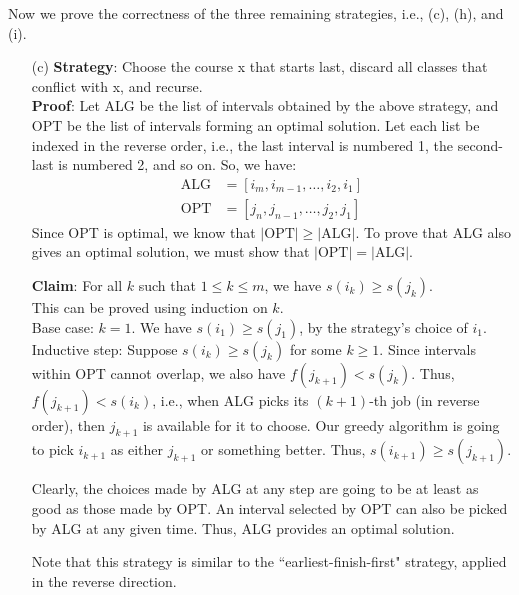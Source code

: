 \documentclass[11pt, fleqn]{article}
\begin{document}
\bigskip

Now we prove the correctness of the three remaining strategies, i.e., (c), (h), and (i).

\begin{itemize}
    \item[(c)]
    \textbf{Strategy}: Choose the course x that starts last, discard all classes that conflict with x, and recurse.\\
    \textbf{Proof}: Let ALG be the list of intervals obtained by the above strategy, and OPT be the list of intervals forming an optimal solution. Let each list be indexed in the reverse order, i.e., the last interval is numbered 1, the second-last is numbered 2, and so on. So, we have:
    \begin{align}
        \text{ALG} &= [i_m, i_{m-1}, \dots, i_2, i_1]\\
        \text{OPT} &= [j_n, j_{n-1}, \dots, j_2, j_1]
    \end{align}
    Since OPT is optimal, we know that $\lvert \text{OPT}\rvert \geq \lvert \text{ALG}\rvert$. To prove that ALG also gives an optimal solution, we must show that $\lvert \text{OPT}\rvert = \lvert \text{ALG}\rvert$.
    
    \medskip
    
    \textbf{Claim}: For all $k$ such that $1\leq k\leq m$, we have $s(i_k) \geq s(j_k)$.\\
    This can be proved using induction on $k$.\\
    Base case: $k=1$. We have $s(i_1)\geq s(j_1)$, by the strategy's choice of $i_1$.\\
    Inductive step: Suppose $s(i_k) \geq s(j_k)$ for some $k\geq 1$. Since intervals within OPT cannot overlap, we also have $f(j_{k+1}) < s(j_k)$. Thus, $f(j_{k+1}) < s(i_k)$, i.e., when ALG picks its $(k+1)$-th job (in reverse order), then $j_{k+1}$ is available for it to choose. Our greedy algorithm is going to pick $i_{k+1}$ as either $j_{k+1}$ or something better. Thus, $s(i_{k+1}) \geq s(j_{k+1})$.
    
    \medskip
    
    Clearly, the choices made by ALG at any step are going to be at least as good as those made by OPT. An interval selected by OPT can also be picked by ALG at any given time. Thus, ALG provides an optimal solution.
    
    \medskip
    
    Note that this strategy is similar to the ``earliest-finish-first" strategy, applied in the reverse direction.
    

\end{itemize}
\end{document}
